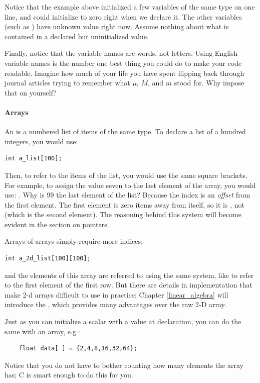 Notice that the example above initialized a few variables of the same
type on one line, and could initialize  to zero right when we
declare it. The other variables (such as ) have unknown
value right now. Assume nothing about what is contained in a declared
but uninitialized value.

Finally, notice that the variable names are words, not letters. Using
English variable names is the number one best thing you could do to
make your code readable. Imagine how much of your life you have spent
flipping back through journal articles trying to remember what $\mu$,
$M$, and $m$ stood for. Why impose that on yourself?

\paragraph{Arrays} An  is a numbered list of items of the same type. To declare a list of a hundred
integers, you would use:
\begin{lstlisting}
int a_list[100];
\end{lstlisting}
Then, to refer to the items of the list, you would use the same square
brackets. For example, to assign the value seven to the last element
of the array, you would use: . Why is 99 the last
element of the list? Because the index is an {\sl offset} from the first
element. The first element is zero items away from itself, so it is
, not  (which is the second element).
The reasoning behind this system will become evident in the section
on pointers.

Arrays of arrays simply require more indices:\\
\begin{lstlisting}
int a_2d_list[100][100];
\end{lstlisting}
and the elements of this array are referred to using the same system,
like 
 to refer to the first element of the first row.
But there are details in implementation that make 2-d arrays difficult
to use in practice; Chapter \ref{linear_algebra} will introduce
the , which provides many advantages over the raw
2-D array.

Just as you can initialize a scalar with a value at declaration, you can
do the same with an array, e.g.:
\begin{lstlisting}
    float data[ ] = {2,4,8,16,32,64};
\end{lstlisting}
Notice that you do not have to bother counting how many elements the
array has; C is smart enough to do this for you.

